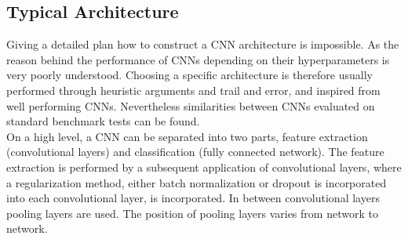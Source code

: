\subsection{Typical Architecture}
Giving a detailed plan how to construct a CNN architecture is impossible. As the reason behind the performance of CNNs depending on their hyperparameters is very poorly understood. Choosing a specific architecture is therefore usually performed through heuristic arguments and trail and error, and inspired from well performing CNNs. Nevertheless similarities between CNNs evaluated on standard benchmark tests can be found. \\

On a high level, a CNN can be separated into two parts, feature extraction (convolutional layers) and classification (fully connected network). The feature extraction is performed by a subsequent application of convolutional layers, where a regularization method, either batch normalization or dropout is incorporated into each convolutional layer, is incorporated. In between convolutional layers pooling layers are used. The position of pooling layers varies from network to network.
%
%
%
%
%



